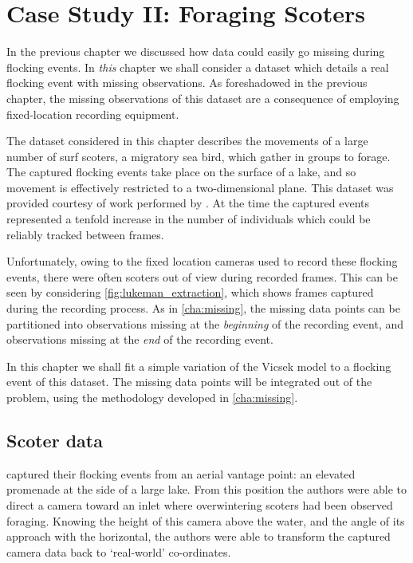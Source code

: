 \graphicspath{{fig/scoters/}}

\chapter{Case Study II: Foraging Scoters}
\label{cha:scoters}

In the previous chapter we discussed how data could easily go missing during
flocking events. In \emph{this} chapter we shall consider a dataset which
details a real flocking event with missing observations. As foreshadowed in the
previous chapter, the missing observations of this dataset are a consequence of
employing fixed-location recording equipment.

The dataset considered in this chapter describes the movements of a large
number of surf scoters, a migratory sea bird, which gather in groups to forage.
The captured flocking events take place on the surface of a lake, and so
movement is effectively restricted to a two-dimensional plane. This dataset was
provided courtesy of work performed by \textcite{lukeman09,lukeman10}. At the
time the captured events represented a tenfold increase in the number of
individuals which could be reliably tracked between frames.

Unfortunately, owing to the fixed location cameras used to record these
flocking events, there were often scoters out of view during recorded frames.
This can be seen by considering \cref{fig:lukeman_extraction}, which shows
frames captured during the recording process. As in \cref{cha:missing}, the
missing data points can be partitioned into observations missing at the
\emph{beginning} of the recording event, and observations missing at the
\emph{end} of the recording event.

In this chapter we shall fit a simple variation of the Vicsek model to a
flocking event of this dataset. The missing data points will be integrated out
of the problem, using the methodology developed in \cref{cha:missing}.

\section{Scoter data}

\textcite{lukeman10} captured their flocking events from an aerial vantage
point: an elevated promenade at the side of a large lake. From this position
the authors were able to direct a camera toward an inlet where overwintering
scoters had been observed foraging. Knowing the height of this camera above the
water, and the angle of its approach with the horizontal, the authors were able
to transform the captured camera data back to `real-world' co-ordinates.


